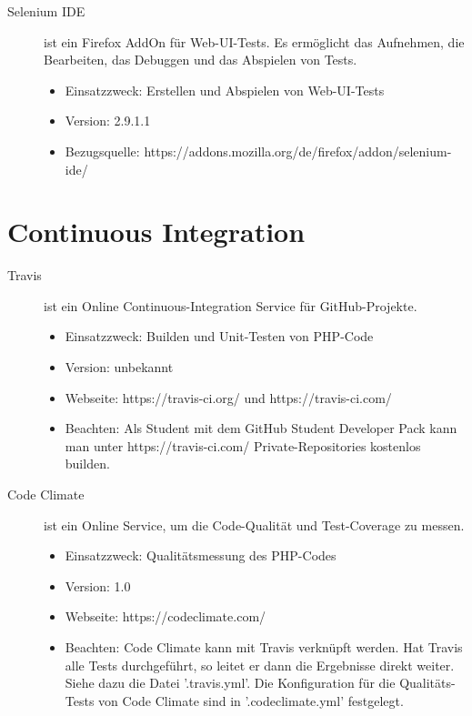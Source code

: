 \begin{description}
	
	\item [Selenium IDE] ist ein Firefox AddOn für Web-UI-Tests. Es ermöglicht das Aufnehmen, die Bearbeiten, das Debuggen und das Abspielen von Tests.
	\begin{itemize}
		\item Einsatzzweck: Erstellen und Abspielen von Web-UI-Tests
		\item Version: 2.9.1.1
		\item Bezugsquelle: https://addons.mozilla.org/de/firefox/addon/selenium-ide/
	\end{itemize}
\end{description}



\section{Continuous Integration}

\begin{description}
	\item [Travis] ist ein Online Continuous-Integration Service für GitHub-Projekte.
	\begin{itemize}
		\item Einsatzzweck: Builden und Unit-Testen von PHP-Code
		\item Version: unbekannt
		\item Webseite: https://travis-ci.org/ und https://travis-ci.com/
		\item Beachten: Als Student mit dem GitHub Student Developer Pack kann man unter https://travis-ci.com/ Private-Repositories kostenlos builden.
	\end{itemize}
	
	
	\item [Code Climate] ist ein Online Service, um die Code-Qualität und Test-Coverage zu messen.
	\begin{itemize}
		\item Einsatzzweck: Qualitätsmessung des PHP-Codes
		\item Version: 1.0
		\item Webseite: https://codeclimate.com/
		\item Beachten: Code Climate kann mit Travis verknüpft werden. Hat Travis alle Tests durchgeführt, so leitet er dann die Ergebnisse direkt weiter. Siehe dazu die Datei '.travis.yml'. Die Konfiguration für die Qualitäts-Tests von Code Climate sind in '.codeclimate.yml' festgelegt.
	\end{itemize}
\end{description}



